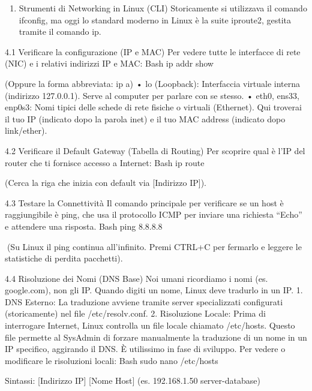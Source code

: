 \documentclass[11pt,a4paper]{article}
\providecommand{\tightlist}{%
  \setlength{\itemsep}{0pt}\setlength{\parskip}{0pt}}
\begin{document}
\begin{enumerate}
\def\labelenumi{\arabic{enumi}.}
\setcounter{enumi}{3}
\tightlist
\item
  Strumenti di Networking in Linux (CLI) Storicamente si utilizzava il
  comando ifconfig, ma oggi lo standard moderno in Linux è la suite
  iproute2, gestita tramite il comando ip.
\end{enumerate}

4.1 Verificare la configurazione (IP e MAC) Per vedere tutte le
interfacce di rete (NIC) e i relativi indirizzi IP e MAC: Bash ip addr
show

(Oppure la forma abbreviata: ip a) • lo (Loopback): Interfaccia virtuale
interna (indirizzo 127.0.0.1). Serve al computer per parlare con se
stesso. • eth0, ens33, enp0s3: Nomi tipici delle schede di rete fisiche
o virtuali (Ethernet). Qui troverai il tuo IP (indicato dopo la parola
inet) e il tuo MAC address (indicato dopo link/ether).

4.2 Verificare il Default Gateway (Tabella di Routing) Per scoprire qual
è l'IP del router che ti fornisce accesso a Internet: Bash ip route

(Cerca la riga che inizia con default via {[}Indirizzo IP{]}).

4.3 Testare la Connettività Il comando principale per verificare se un
host è raggiungibile è ping, che usa il protocollo ICMP per inviare una
richiesta ``Echo'' e attendere una risposta. Bash ping 8.8.8.8

(Su Linux il ping continua all'infinito. Premi CTRL+C per fermarlo e
leggere le statistiche di perdita pacchetti).

4.4 Risoluzione dei Nomi (DNS Base) Noi umani ricordiamo i nomi (es.
google.com), non gli IP. Quando digiti un nome, Linux deve tradurlo in
un IP. 1. DNS Esterno: La traduzione avviene tramite server
specializzati configurati (storicamente) nel file /etc/resolv.conf. 2.
Risoluzione Locale: Prima di interrogare Internet, Linux controlla un
file locale chiamato /etc/hosts. Questo file permette al SysAdmin di
forzare manualmente la traduzione di un nome in un IP specifico,
aggirando il DNS. È utilissimo in fase di sviluppo. Per vedere o
modificare le risoluzioni locali: Bash sudo nano /etc/hosts

Sintassi: {[}Indirizzo IP{]} {[}Nome Host{]} (es. 192.168.1.50
server-database)
\end{document}
